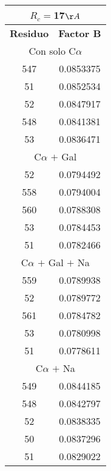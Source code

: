 \begin{tabular}[c]{|c|c|}
\multicolumn{2}{c}{$R_c=$17$\AA$}\\\hline
\textbf{Residuo}&\textbf{Factor B}\\\hline
\multicolumn{2}{c}{Con solo C$\alpha$}\\\hline
       547& 0.0853375\\
        51& 0.0852534\\
        52& 0.0847917\\
       548& 0.0841381\\
        53& 0.0836471\\\hline
\multicolumn{2}{c}{C$\alpha$ $+$ Gal}\\\hline
        52& 0.0794492\\
       558& 0.0794004\\
       560& 0.0788308\\
        53& 0.0784453\\
        51& 0.0782466\\\hline
\multicolumn{2}{c}{C$\alpha$ $+$ Gal $+$ Na}\\\hline
       559& 0.0789938\\
        52& 0.0789772\\
       561& 0.0784782\\
        53& 0.0780998\\
        51& 0.0778611\\\hline
\multicolumn{2}{c}{C$\alpha$ $+$ Na}\\\hline
       549& 0.0844185\\
       548& 0.0842797\\
        52& 0.0838335\\
        50& 0.0837296\\
        51& 0.0829022\\\hline
\end{tabular}
